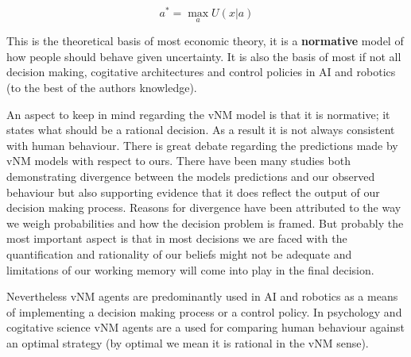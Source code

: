 \begin{equation*}
 a^* = \max_a U(x|a)
\end{equation*}


This is the theoretical basis of most economic theory,
it is a \textbf{normative} model of how people should behave given uncertainty. It is also the basis of most 
if not all decision making, cogitative architectures and control policies in AI and robotics 
(to the best of the authors knowledge).

An aspect to keep in mind regarding the vNM model is that it is normative; it states what should be a rational decision. 
As a result it is not always consistent with human behaviour. There is great debate regarding 
the predictions made by vNM models with respect to ours. There have been many studies both demonstrating divergence 
between the models predictions and our observed behaviour but also supporting evidence that it does reflect 
the output of our decision making process. Reasons for divergence have been attributed to the way we 
weigh probabilities and how the decision problem is framed. But probably the most important aspect is that 
in most decisions we are faced with the quantification and rationality of our beliefs might not be adequate
and limitations of our working memory will come into play in the final decision.

Nevertheless vNM agents are predominantly used in AI and robotics as a means of implementing 
a decision making process or a control policy. In psychology and cogitative science vNM agents
are a used for comparing human behaviour against an optimal strategy (by optimal we mean it is rational in 
the vNM sense). 


